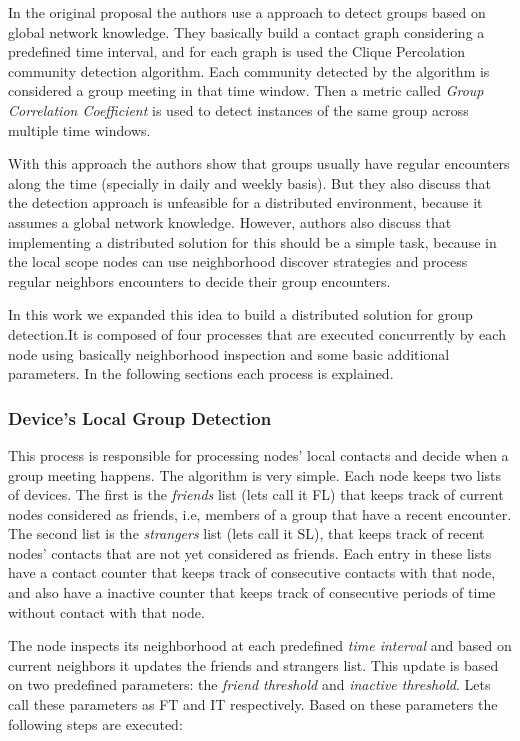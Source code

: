 In the original proposal the authors use a approach to detect groups based on global network knowledge. They basically
build a contact graph considering a predefined time interval, and for each graph is used the Clique Percolation community
detection algorithm. Each community detected by the algorithm is considered a group meeting in that time window. Then
a metric called \textit{Group Correlation Coefficient} is used to detect instances of the same group across multiple time
windows.

With this approach the authors show that groups usually have regular encounters along the time (specially in daily and weekly basis).
But they also discuss that the detection approach is unfeasible for a distributed environment, because it assumes a global network
knowledge. However, authors also discuss that implementing a distributed solution for this should be a simple task, because in the local
scope nodes can use neighborhood discover strategies and process regular neighbors encounters to decide their group encounters.

In this work we expanded this idea to build a distributed solution for group detection.It is composed of four processes
that are executed concurrently by each node using basically neighborhood inspection and some basic additional parameters. In the following sections each process is explained.

\subsubsection{Device's Local Group Detection}

This process is responsible for processing nodes' local contacts and decide when a group meeting happens.
The algorithm is very simple. Each node keeps two lists of devices. The first is the \textit{friends} list (lets call it FL)
that keeps track of current nodes considered as friends, i.e, members of a group that have a recent encounter.
The second list is the \textit{strangers} list (lets call it SL), that keeps track of recent nodes' contacts that are not yet
considered as friends. Each entry in these lists have a contact counter that keeps track of consecutive
contacts with that node, and also have a inactive counter that keeps track of consecutive periods of time
without contact with that node.

The node inspects its neighborhood at each predefined \textit{time interval} and based on current neighbors
it updates the friends and strangers list. This update is based on two predefined parameters: the \textit{friend threshold}
and \textit{inactive threshold}. Lets call these parameters as FT and IT respectively. Based on these parameters the following
steps are executed:

